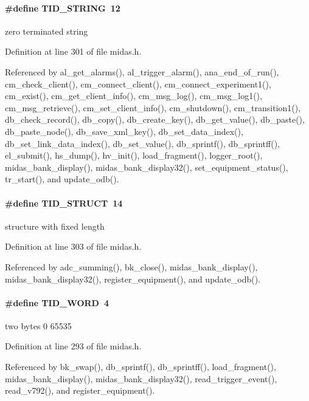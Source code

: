 \paragraph[{TID\_\-STRING}]{\setlength{\rightskip}{0pt plus 5cm}\#define TID\_\-STRING~12}\hfill\label{group__mdefineh_gab81af1d9631a5c29500d506f0c3470cd}
zero terminated string 

Definition at line 301 of file midas.h.

Referenced by al\_\-get\_\-alarms(), al\_\-trigger\_\-alarm(), ana\_\-end\_\-of\_\-run(), cm\_\-check\_\-client(), cm\_\-connect\_\-client(), cm\_\-connect\_\-experiment1(), cm\_\-exist(), cm\_\-get\_\-client\_\-info(), cm\_\-msg\_\-log(), cm\_\-msg\_\-log1(), cm\_\-msg\_\-retrieve(), cm\_\-set\_\-client\_\-info(), cm\_\-shutdown(), cm\_\-transition1(), db\_\-check\_\-record(), db\_\-copy(), db\_\-create\_\-key(), db\_\-get\_\-value(), db\_\-paste(), db\_\-paste\_\-node(), db\_\-save\_\-xml\_\-key(), db\_\-set\_\-data\_\-index(), db\_\-set\_\-link\_\-data\_\-index(), db\_\-set\_\-value(), db\_\-sprintf(), db\_\-sprintff(), el\_\-submit(), hs\_\-dump(), hv\_\-init(), load\_\-fragment(), logger\_\-root(), midas\_\-bank\_\-display(), midas\_\-bank\_\-display32(), set\_\-equipment\_\-status(), tr\_\-start(), and update\_\-odb().
\paragraph[{TID\_\-STRUCT}]{\setlength{\rightskip}{0pt plus 5cm}\#define TID\_\-STRUCT~14}\hfill\label{group__mdefineh_ga8d82076a05b53876103e1c53d5878b75}
structure with fixed length 

Definition at line 303 of file midas.h.

Referenced by adc\_\-summing(), bk\_\-close(), midas\_\-bank\_\-display(), midas\_\-bank\_\-display32(), register\_\-equipment(), and update\_\-odb().
\paragraph[{TID\_\-WORD}]{\setlength{\rightskip}{0pt plus 5cm}\#define TID\_\-WORD~4}\hfill\label{group__mdefineh_ga681cbe2c114c62cecccb882544d2debb}
two bytes 0 65535 

Definition at line 293 of file midas.h.

Referenced by bk\_\-swap(), db\_\-sprintf(), db\_\-sprintff(), load\_\-fragment(), midas\_\-bank\_\-display(), midas\_\-bank\_\-display32(), read\_\-trigger\_\-event(), read\_\-v792(), and register\_\-equipment().
